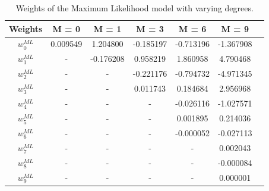 \documentclass[12pt,twoside,a4paper]{article}
\begin{document}
\begin{table}[H]
\centering
\begin{tabular}{|c|c|c|c|c|c|c|}
\hline
\textbf{Weights}              & \textbf{M = 0} & \textbf{M = 1} & \textbf{M = 3} & \textbf{M = 6} & \textbf{M = 9} \\\hline
\textit{\textbf{$w_0^{ML}$}} & 0.009549       & 1.204800       & -0.185197      & -0.713196      & -1.367908      \\\hline
\textit{\textbf{$w_1^{ML}$}}  & -              & -0.176208      & 0.958219       & 1.860958       & 4.790468       \\\hline
\textit{\textbf{$w_2^{ML}$}} & - & - & -0.221176 & -0.794732 & -4.971345 \\\hline
\textit{\textbf{$w_3^{ML}$}} & - & - & 0.011743  & 0.184684  & 2.956968  \\\hline
\textit{\textbf{$w_4^{ML}$}} & - & - & -         & -0.026116 & -1.027571 \\\hline
\textit{\textbf{$w_5^{ML}$}} & - & - & -         & 0.001895  & 0.214036  \\\hline
\textit{\textbf{$w_6^{ML}$}} & - & - & -         & -0.000052 & -0.027113 \\\hline
\textit{\textbf{$w_7^{ML}$}} & - & - & -         & -         & 0.002043  \\\hline
\textit{\textbf{$w_8^{ML}$}} & - & - & -         & -         & -0.000084 \\\hline
\textit{\textbf{$w_9^{ML}$}} & - & - & -         & -         & 0.000001 \\\hline
\end{tabular}
\caption{Weights of the Maximum Likelihood model with varying degrees.}
\label{MLWEIGHTS}
\end{table}
\end{document}
